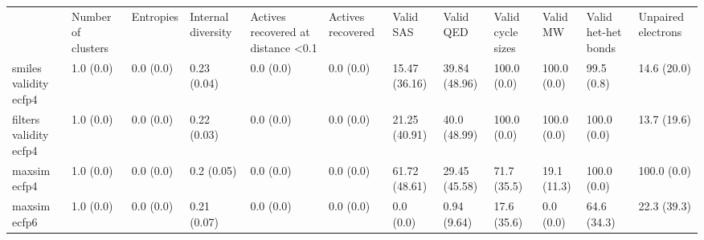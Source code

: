 \begin{tabular}{llllllllllll}
 & Number of clusters & Entropies & Internal diversity & Actives recovered at distance <0.1 & Actives recovered & Valid SAS & Valid QED & Valid cycle sizes & Valid MW & Valid het-het bonds & Unpaired electrons \\
smiles validity ecfp4 & {\cellcolor[HTML]{F6FCFD}} \color[HTML]{000000} 1.0 (0.0) & {\cellcolor[HTML]{F7FCFD}} \color[HTML]{000000} 0.0 (0.0) & {\cellcolor[HTML]{8CD2BF}} \color[HTML]{000000} 0.23 (0.04) & {\cellcolor[HTML]{F7FCFD}} \color[HTML]{000000} 0.0 (0.0) & {\cellcolor[HTML]{F7FCFD}} \color[HTML]{000000} 0.0 (0.0) & {\cellcolor[HTML]{DFF3F5}} \color[HTML]{000000} 15.47 (36.16) & {\cellcolor[HTML]{8FD4C2}} \color[HTML]{000000} 39.84 (48.96) & {\cellcolor[HTML]{F6FCFD}} \color[HTML]{000000} 100.0 (0.0) & {\cellcolor[HTML]{F7FCFD}} \color[HTML]{000000} 100.0 (0.0) & {\cellcolor[HTML]{F2FAFC}} \color[HTML]{000000} 99.5 (0.8) & {\cellcolor[HTML]{67C2A5}} \color[HTML]{000000} 14.6 (20.0) \\
filters validity ecfp4 & {\cellcolor[HTML]{F6FCFD}} \color[HTML]{000000} 1.0 (0.0) & {\cellcolor[HTML]{F7FCFD}} \color[HTML]{000000} 0.0 (0.0) & {\cellcolor[HTML]{61BF9E}} \color[HTML]{000000} 0.22 (0.03) & {\cellcolor[HTML]{F7FCFD}} \color[HTML]{000000} 0.0 (0.0) & {\cellcolor[HTML]{F7FCFD}} \color[HTML]{000000} 0.0 (0.0) & {\cellcolor[HTML]{D4EFEC}} \color[HTML]{000000} 21.25 (40.91) & {\cellcolor[HTML]{8FD4C2}} \color[HTML]{000000} 40.0 (48.99) & {\cellcolor[HTML]{D8F0EF}} \color[HTML]{000000} 100.0 (0.0) & {\cellcolor[HTML]{F7FCFD}} \color[HTML]{000000} 100.0 (0.0) & {\cellcolor[HTML]{00441B}} \color[HTML]{F1F1F1} 100.0 (0.0) & {\cellcolor[HTML]{56BA91}} \color[HTML]{F1F1F1} 13.7 (19.6) \\
maxsim ecfp4 & {\cellcolor[HTML]{F6FCFD}} \color[HTML]{000000} 1.0 (0.0) & {\cellcolor[HTML]{F7FCFD}} \color[HTML]{000000} 0.0 (0.0) & {\cellcolor[HTML]{64C1A2}} \color[HTML]{000000} 0.2 (0.05) & {\cellcolor[HTML]{F7FCFD}} \color[HTML]{000000} 0.0 (0.0) & {\cellcolor[HTML]{F7FCFD}} \color[HTML]{000000} 0.0 (0.0) & {\cellcolor[HTML]{43AF78}} \color[HTML]{F1F1F1} 61.72 (48.61) & {\cellcolor[HTML]{BAE5DC}} \color[HTML]{000000} 29.45 (45.58) & {\cellcolor[HTML]{E9F7FA}} \color[HTML]{000000} 71.7 (35.5) & {\cellcolor[HTML]{F7FCFD}} \color[HTML]{000000} 19.1 (11.3) & {\cellcolor[HTML]{A5DDD0}} \color[HTML]{000000} 100.0 (0.0) & {\cellcolor[HTML]{2F9858}} \color[HTML]{F1F1F1} 100.0 (0.0) \\
maxsim ecfp6 & {\cellcolor[HTML]{F6FCFD}} \color[HTML]{000000} 1.0 (0.0) & {\cellcolor[HTML]{F7FCFD}} \color[HTML]{000000} 0.0 (0.0) & {\cellcolor[HTML]{95D6C6}} \color[HTML]{000000} 0.21 (0.07) & {\cellcolor[HTML]{F7FCFD}} \color[HTML]{000000} 0.0 (0.0) & {\cellcolor[HTML]{F7FCFD}} \color[HTML]{000000} 0.0 (0.0) & {\cellcolor[HTML]{F7FCFD}} \color[HTML]{000000} 0.0 (0.0) & {\cellcolor[HTML]{F6FCFD}} \color[HTML]{000000} 0.94 (9.64) & {\cellcolor[HTML]{F7FCFD}} \color[HTML]{000000} 17.6 (35.6) & {\cellcolor[HTML]{F7FCFD}} \color[HTML]{000000} 0.0 (0.0) & {\cellcolor[HTML]{B5E3D9}} \color[HTML]{000000} 64.6 (34.3) & {\cellcolor[HTML]{5DBD99}} \color[HTML]{000000} 22.3 (39.3) \\

\end{tabular}
